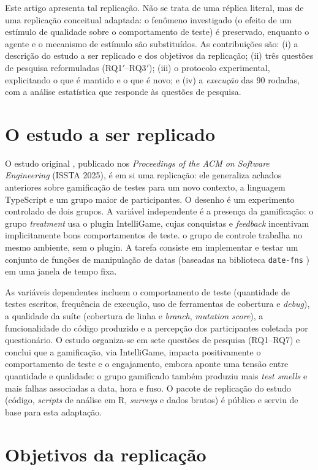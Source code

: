 \documentclass[12pt]{article}
\begin{document}
Este artigo apresenta tal replicação. Não se trata de uma réplica literal, mas
de uma replicação conceitual adaptada: o fenômeno investigado (o efeito de um
estímulo de qualidade sobre o comportamento de teste) é preservado, enquanto o
agente e o mecanismo de estímulo são substituídos. As contribuições são: (i) a
descrição do estudo a ser replicado e dos objetivos da replicação; (ii) três
questões de pesquisa reformuladas (RQ1$'$--RQ3$'$); (iii) o protocolo
experimental, explicitando o que é mantido e o que é novo; e (iv) a
\emph{execução} das 90 rodadas, com a análise estatística que responde às
questões de pesquisa.

\section{O estudo a ser replicado}

O estudo original \cite{straubinger2025}, publicado nos \emph{Proceedings of
the ACM on Software Engineering} (ISSTA 2025), é em si uma replicação: ele
generaliza achados anteriores sobre gamificação de testes para um novo contexto, a linguagem TypeScript e um grupo maior de participantes. O desenho é um
experimento controlado de dois grupos. A variável independente é a presença da
gamificação: o grupo \emph{treatment} usa o plugin IntelliGame, cujas
conquistas e \emph{feedback} incentivam implicitamente bons comportamentos de
teste. o grupo de controle trabalha no mesmo ambiente, sem o plugin. A tarefa
consiste em implementar e testar um conjunto de funções de manipulação de datas
(baseadas na biblioteca \texttt{date-fns} \cite{datefns}) em uma janela de
tempo fixa.

As variáveis dependentes incluem o comportamento de teste (quantidade de testes
escritos, frequência de execução, uso de ferramentas de cobertura e
\emph{debug}), a qualidade da suíte (cobertura de linha e \emph{branch},
\emph{mutation score}), a funcionalidade do código produzido e a percepção dos
participantes coletada por questionário. O estudo organiza-se em sete questões
de pesquisa (RQ1--RQ7) e conclui que a gamificação, via IntelliGame, impacta
positivamente o comportamento de teste e o engajamento, embora aponte uma
tensão entre quantidade e qualidade: o grupo gamificado também produziu mais
\emph{test smells} e mais falhas associadas a data, hora e fuso. O pacote de
replicação do estudo (código, \emph{scripts} de análise em R, \emph{surveys} e
dados brutos) é público e serviu de base para esta adaptação.

\section{Objetivos da replicação}
\end{document}
